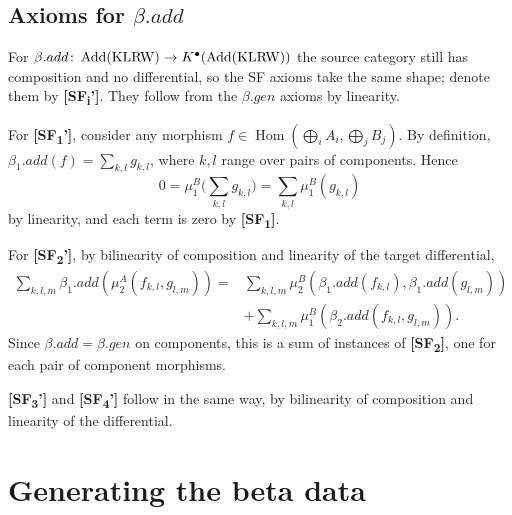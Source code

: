 \subsection{Axioms for \texorpdfstring{$\beta.add$}{beta.add}}
For $\beta.add\colon \operatorname{Add}(\operatorname{KLRW})\to K^{\bullet}(\operatorname{Add}(\operatorname{KLRW}))$ the
source category still has composition and no differential, so the SF axioms take the same shape;
denote them by \textbf{[SF\textsubscript{i}']}. They follow from the $\beta.gen$ axioms by
linearity.

For \textbf{[SF\textsubscript{1}']}, consider any morphism
$f\in \operatorname{Hom}\left(\bigoplus_i A_i, \bigoplus_j B_j\right)$. By definition,
$\beta_1.add(f) = \sum_{k, l}g_{k, l}$, where $k, l$ range over pairs of components. Hence
$$0=\mu_1^B\Big(\sum_{k, l}g_{k, l}\Big)=\sum_{k, l}\mu_1^B(g_{k, l})$$
by linearity, and each term is zero by \textbf{[SF\textsubscript{1}]}.

For \textbf{[SF\textsubscript{2}']}, by bilinearity of composition and linearity of the target
differential,
\begin{align*}
  \sum_{k, l, m}\beta_1.add(\mu_2^A(f_{k, l}, g_{l, m}))
    = &\sum_{k, l, m}\mu_2^B(\beta_1.add(f_{k, l}), \beta_1.add(g_{l, m})) \\
      &+ \sum_{k, l, m}\mu_1^B(\beta_2.add(f_{k, l}, g_{l, m})).
\end{align*}
Since $\beta.add = \beta.gen$ on components, this is a sum of instances of
\textbf{[SF\textsubscript{2}]}, one for each pair of component morphisms.

\textbf{[SF\textsubscript{3}']} and \textbf{[SF\textsubscript{4}']} follow in the same way, by
bilinearity of composition and linearity of the differential.

\section{Generating the beta data}

